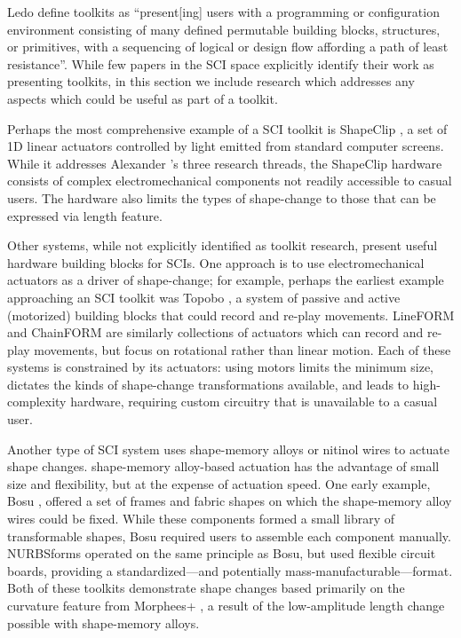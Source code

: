       Ledo \etal \cite{10.1145/3173574.3173610} define toolkits as
      ``present[ing] users with a programming or configuration environment
      consisting of many defined permutable building blocks, structures, or
      primitives, with a sequencing of logical or design flow affording a path
      of least resistance''. While few papers in the SCI space explicitly
      identify their work as presenting toolkits, in this section we include
      research which addresses any aspects which could be useful as part of a
      toolkit.
      
      Perhaps the most comprehensive example of a SCI toolkit is ShapeClip
      \cite{Hardy:2015dx}, a set of 1D linear actuators controlled by light
      emitted from standard computer screens. While it addresses Alexander
      \etal's three research threads, the ShapeClip hardware consists of complex
      electromechanical components not readily accessible to casual users. The
      hardware also limits the types of shape-change to those that can be
      expressed via length feature.
      
      Other systems, while not explicitly identified as toolkit research,
      present useful hardware building blocks for SCIs. One approach is to use
      electromechanical actuators as a driver of shape-change; for example,
      perhaps the earliest example approaching an SCI toolkit was Topobo
      \cite{Raffle:2004jj}, a system of passive and active (motorized) building
      blocks that could record and re-play movements. LineFORM
      \cite{10.1145/2807442.2807452} and ChainFORM \cite{nakagaki2016chainform}
      are similarly collections of actuators which can record and re-play
      movements, but focus on rotational rather than linear motion. Each of
      these systems is constrained by its actuators: using motors limits the
      minimum size, dictates the kinds of shape-change transformations
      available, and leads to high-complexity hardware, requiring custom
      circuitry that is unavailable to a casual user.
      
      Another type of SCI system uses shape-memory alloys or nitinol wires to
      actuate shape changes. shape-memory alloy-based actuation has the
      advantage of small size and flexibility, but at the expense of actuation
      speed. One early example, Bosu \cite{10.1145/1858171.1858205}, offered a
      set of frames and fabric shapes on which the shape-memory alloy wires
      could be fixed. While these components formed a small library of
      transformable shapes, Bosu required users to assemble each component
      manually.  NURBSforms \cite{10.1145/3374920.3374927} operated on the same
      principle as Bosu, but used flexible circuit boards, providing a
      standardized---and potentially mass-manufacturable---format. Both of these
      toolkits demonstrate shape changes based primarily on the curvature
      feature from Morphees+ \cite{10.1145/3173574.3174193}, a result of the
      low-amplitude length change possible with shape-memory alloys.
      
